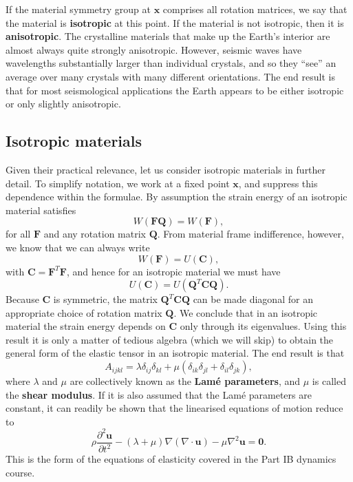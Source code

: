 If the material symmetry
group at $\mathbf{x}$ comprises all rotation matrices, we say that the material is \textbf{isotropic} at this point. If the material 
   is not isotropic, then it is \textbf{anisotropic}. The crystalline materials that make up the Earth's interior are almost always 
   quite strongly anisotropic. However, seismic waves have wavelengths substantially larger than individual crystals, and so they ``see'' an 
   average over many crystals with many different orientations. The end result is that for most seismological applications the Earth 
   appears to be either isotropic or only slightly anisotropic.

\subsection*{Isotropic materials}

Given their practical relevance, let us consider isotropic materials in further detail. To simplify notation, 
we work at a fixed point $\mathbf{x}$, and suppress this dependence within the formulae. By assumption the strain energy of an 
isotropic material satisfies
\begin{equation}
W(\mathbf{F}\mathbf{Q}) = W(\mathbf{F}),
\label{eq:39}
\end{equation}
for all $\mathbf{F}$ and any rotation matrix $\mathbf{Q}$. From material frame indifference, however, we know that we can always write
\begin{equation}
W(\mathbf{F}) = U(\mathbf{C}),
\label{eq:40}
\end{equation}
with $\mathbf{C} = \mathbf{F}^{T}\mathbf{F}$, and hence for an isotropic material we must have
\begin{equation}
U(\mathbf{C}) = U(\mathbf{Q}^{T}\mathbf{C}\mathbf{Q}).
\label{eq:41}
\end{equation}
Because $\mathbf{C}$ is symmetric, the matrix $\mathbf{Q}^{T}\mathbf{C}\mathbf{Q}$ can be made diagonal for
 an appropriate choice of rotation matrix $\mathbf{Q}$. We conclude that in an isotropic material the strain 
 energy depends on $\mathbf{C}$ only through its eigenvalues. Using this result it is only a matter of tedious algebra 
 (which we will skip) to obtain the general form of the elastic tensor in an isotropic material. The end result is that
\begin{equation}
A_{ijkl} = \lambda\delta_{ij}\delta_{kl} + \mu(\delta_{ik}\delta_{jl} + \delta_{il}\delta_{jk}),
\label{eq:42}
\end{equation}
where $\lambda$ and $\mu$ are collectively known as the \textbf{Lamé parameters}, and $\mu$ is 
called the \textbf{shear modulus}. If it is also assumed that the Lamé parameters are constant, it can readily be shown that
 the linearised equations of motion reduce to
\begin{equation}
\rho\frac{\partial^2 \mathbf{u}}{\partial t^2} - (\lambda + \mu)\nabla(\nabla\cdot \mathbf{u}) - \mu\nabla^2 \mathbf{u} = \mathbf{0}.
\label{eq:43}
\end{equation}
This is the form of the equations of elasticity covered in the Part IB dynamics course. 

